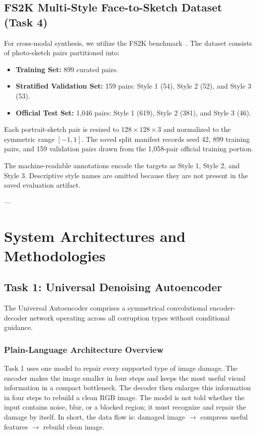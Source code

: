 \documentclass[journal,compsoc]{IEEEtran}
\begin{document}
\subsection{FS2K Multi-Style Face-to-Sketch Dataset (Task 4)}
For cross-modal synthesis, we utilize the FS2K benchmark~\cite{chen2022fs2k}. The dataset consists of photo-sketch pairs partitioned into:
\begin{itemize}
    \item \textbf{Training Set:} 899 curated pairs.
    \item \textbf{Stratified Validation Set:} 159 pairs: Style 1 (54), Style 2 (52), and Style 3 (53).
    \item \textbf{Official Test Set:} 1,046 pairs: Style 1 (619), Style 2 (381), and Style 3 (46).
\end{itemize}
Each portrait-sketch pair is resized to $128 \times 128 \times 3$ and normalized to the symmetric range $[-1, 1]$. The saved split manifest records seed 42, 899 training pairs, and 159 validation pairs drawn from the 1,058-pair official training portion.

The machine-readable annotations encode the targets as Style 1, Style 2, and Style 3. Descriptive style names are omitted because they are not present in the saved evaluation artifact.

---

\section{System Architectures and Methodologies}
\label{sec:methodology}

\subsection{Task 1: Universal Denoising Autoencoder}
The Universal Autoencoder comprises a symmetrical convolutional encoder-decoder network operating across all corruption types without conditional guidance.

\subsubsection{Plain-Language Architecture Overview}
Task 1 uses one model to repair every supported type of image damage. The encoder makes the image smaller in four steps and keeps the most useful visual information in a compact bottleneck. The decoder then enlarges this information in four steps to rebuild a clean RGB image. The model is not told whether the input contains noise, blur, or a blocked region; it must recognize and repair the damage by itself. In short, the data flow is: damaged image $\rightarrow$ compress useful features $\rightarrow$ rebuild clean image.
\end{document}

